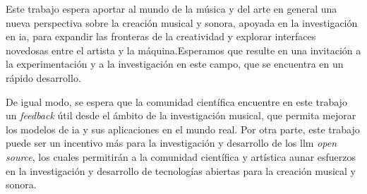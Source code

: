 Este trabajo espera aportar al mundo de la música y del arte en general una nueva perspectiva sobre la creación musical y sonora, apoyada en la investigación en \gls{ia}, para expandir las fronteras de la creatividad y explorar interfaces novedosas entre el artista y la máquina.Esperamos que resulte en una invitación a la experimentación y a la investigación en este campo, que se encuentra en un rápido desarrollo.

De igual modo, se espera que la comunidad científica encuentre en este trabajo un \textit{feedback} útil desde el ámbito de la investigación musical, que permita mejorar los modelos de \gls{ia} y sus aplicaciones en el mundo real. Por otra parte, este trabajo puede ser un incentivo más para la investigación y desarrollo de los \gls{llm} \textit{open source}, los cuales permitirán a la comunidad científica y artística aunar esfuerzos en la investigación y desarrollo de tecnologías abiertas para la creación musical y sonora.


